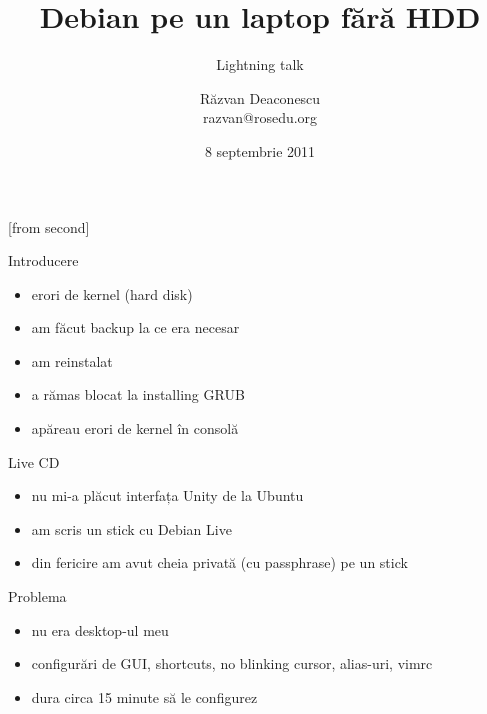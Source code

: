 \documentclass{beamer}
\title[No HDD Debian]{Debian pe un laptop fără HDD}
\subtitle{Lightning talk}
\institute{Întâlnirile lunare RLUG -- Septembrie 2011}
\author[Răzvan Deaconescu]{Răzvan Deaconescu\\
      razvan@rosedu.org}
\date{8 septembrie 2011}
\begin{document}
[from second]

\frame{\titlepage}

\begin{frame}{Introducere}
  \begin{itemize}     %
    \item erori de kernel (hard disk)
    \item am făcut backup la ce era necesar
    \item am reinstalat
    \item a rămas blocat la installing GRUB
    \item apăreau erori de kernel în consolă
  \end{itemize}
\end{frame}

\begin{frame}{Live CD}
  \begin{itemize}
    \item nu mi-a plăcut interfața Unity de la Ubuntu
    \item am scris un stick cu Debian Live
    \item din fericire am avut cheia privată (cu passphrase) pe un stick
  \end{itemize}
\end{frame}

\begin{frame}{Problema}
  \begin{itemize}
    \item nu era desktop-ul meu
    \item configurări de GUI, shortcuts, no blinking cursor, alias-uri, vimrc
    \item dura circa 15 minute să le configurez
  \end{itemize}
\end{frame}
\end{document}
